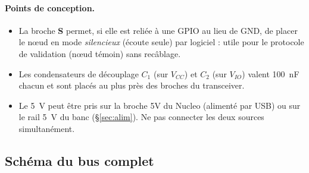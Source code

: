 \documentclass[11pt,a4paper]{article}
\begin{document}
\paragraph{Points de conception.}
\begin{itemize}[nosep]
  \item La broche \textbf{S} permet, si elle est reliée à une GPIO au lieu de GND, de placer le nœud
        en mode \emph{silencieux} (écoute seule) par logiciel : utile pour le protocole de validation
        (nœud témoin) sans recâblage.
  \item Les condensateurs de découplage $C_1$ (sur $V_{CC}$) et $C_2$ (sur $V_{IO}$) valent \SI{100}{nF} chacun et sont placés au plus près des broches du transceiver.
  \item Le \SI{5}{V} peut être pris sur la broche 5V du Nucleo (alimenté par USB) ou sur le rail
        \SI{5}{V} du banc (\S\ref{sec:alim}). Ne pas connecter les deux sources simultanément.
\end{itemize}

\subsection{Schéma du bus complet}
\label{sec:bus}
\end{document}
